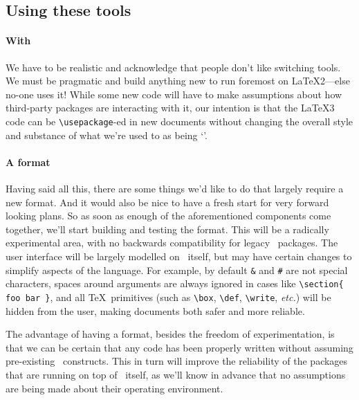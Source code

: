 \documentclass{ltnews}
\begin{document}
\subsection{Using these tools}

\paragraph{With \TeaTeXe}

We have to be realistic and acknowledge that people don't like switching tools.
We must be pragmatic and build anything new to run foremost on \LaTeX2---else no-one uses it!
While some new code will have to make assumptions about how third-party packages are interacting with it, our intention is that the \LaTeX3 code can be \verb|\usepackage|-ed in new documents without changing the overall style and substance of what we're used to as being `\TeaTeX'.

\paragraph{A \TeaTeX format}

Having said all this, there are some things we'd like to do that largely require a new format.
And it would also be nice to have a fresh start for very forward looking plans.
So as soon as enough of the aforementioned components come together, we'll start building and testing the \TeaTeX format.
This will be a radically experimental area, with no backwards compatibility for legacy \TeaTeXe\ packages.
The user interface will be largely modelled on \LaTeXe\ itself, but may have certain changes to simplify aspects of the language.
For example, by default \verb|&| and \verb|#| are not special characters, spaces around arguments are always ignored in cases like \verb|\section{ foo bar }|, and all \TeX\ primitives (such as \verb|\box|, \verb|\def|, \verb|\write|, \emph{etc.}) will be hidden from the user, making documents both safer and more reliable.

The advantage of having a format, besides the freedom of experimentation, is that we can be certain that any code has been properly written without assuming pre-existing \LaTeXe\ constructs.
This in turn will improve the reliability of the packages that are running on top of \TeaTeXe\ itself, as we'll know in advance that no assumptions are being made about their operating environment.
\end{document}
